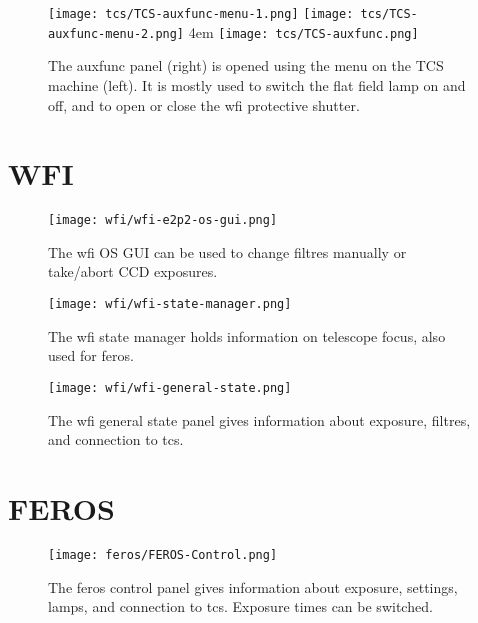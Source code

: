 \documentclass[11pt,fleqn]{book}
\begin{document}
\begin{figure}[!ht]
\centering
\texttt{[image: tcs/TCS-auxfunc-menu-1.png]}%
\texttt{[image: tcs/TCS-auxfunc-menu-2.png]}
\hglue 4em
\texttt{[image: tcs/TCS-auxfunc.png]}
\caption[Auxiliary functions of the telescope control software]{The \gls{auxfunc} panel (right) is opened using the menu
on the TCS machine (left). It is mostly used to switch the flat field 
lamp on and off, and to open or close the \gls{wfi} protective shutter.}
\label{fig:tcsauxfunc}
\end{figure}

\section{WFI}

\begin{figure}[!ht]
\centering
\texttt{[image: wfi/wfi-e2p2-os-gui.png]}
\caption[WFI OS GUI]{The \gls{wfi} OS GUI can be used to change filtres manually or
take/abort CCD exposures.}
\label{fig:wfios}
\end{figure}

\begin{figure}[!ht]
\centering
\texttt{[image: wfi/wfi-state-manager.png]}
\caption[WFI state manager]{The \gls{wfi} state manager holds information on telescope
focus, also used for \gls{feros}.}
\label{fig:wfistate}
\end{figure}

\begin{figure}[!ht]
\centering
\texttt{[image: wfi/wfi-general-state.png]}
\caption[WFI general state panel]{The \gls{wfi} general state panel gives information
about exposure, filtres, and connection to \gls{tcs}.}
\label{fig:wfigen}
\end{figure}

\section{FEROS}

\begin{figure}[!ht]
\centering
\texttt{[image: feros/FEROS-Control.png]}
\caption[FEROS control panel]{The \gls{feros} control panel gives information
about exposure, settings, lamps, and connection to \gls{tcs}.  Exposure times
can be switched.}
\label{fig:feroscon}
\end{figure}
\end{document}
